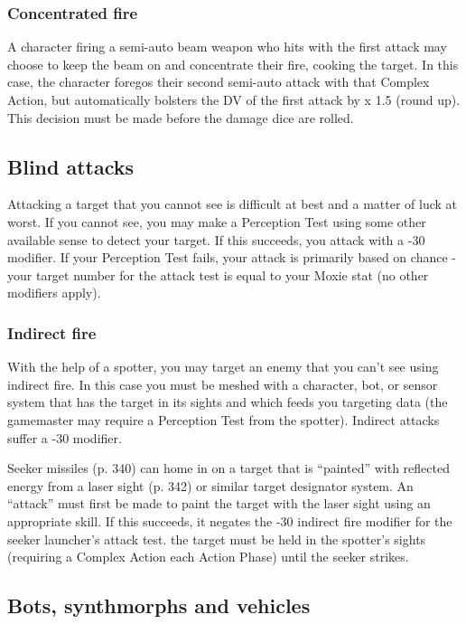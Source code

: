 \subsubsection{Concentrated fire}
A character firing a semi-auto beam weapon who hits with the first attack may choose to keep the beam on and concentrate their fire, cooking the target. In this case, the character foregos their second semi-auto attack with that Complex Action, but automatically bolsters the DV of the first attack by x 1.5 (round up). This decision must be made before the damage dice are rolled.


\subsection{Blind attacks}
\label{sec:blind-attacks}

Attacking a target that you cannot see is difficult at best and a matter of luck at worst. If you cannot see, you may make a Perception Test using some other available sense to detect your target. If this succeeds, you attack with a -30 modifier. If your Perception Test fails, your attack is primarily based on chance - your target number for the attack test is equal to your Moxie stat (no other modifiers apply).

\subsubsection{Indirect fire}
With the help of a spotter, you may target an enemy that you can’t see using indirect fire. In this case you must be meshed with a character, bot, or sensor system that has the target in its sights and which feeds you targeting data (the gamemaster may require a Perception Test from the spotter). Indirect attacks suffer a -30 modifier.

Seeker missiles (p. 340) can home in on a target that is ``painted'' with reflected energy from a laser sight (p. 342) or similar target designator system. An ``attack'' must first be made to paint the target with the laser sight using an appropriate skill. If this succeeds, it negates the -30 indirect fire modifier for the seeker launcher’s attack test. the target must be held in the spotter’s sights (requiring a Complex Action each Action Phase) until the seeker strikes.


\subsection{Bots, synthmorphs and vehicles}
\label{sec:bots-synthmorphs-vehicles}


